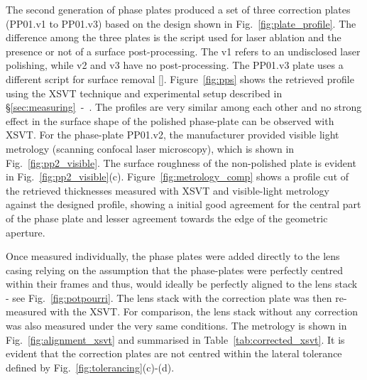 \begin{refsection}
The second generation of phase plates produced a set of three correction plates (PP01.v1 to PP01.v3) based on the design shown in Fig.~\ref{fig:plate_profile}. The difference among the three plates is the script used for laser ablation and the presence or not of a surface post-processing. The v1 refers to an undisclosed laser polishing, while v2 and v3 have no post-processing. The PP01.v3 plate uses a different script for surface removal [\cite{Antipov2020}]. Figure~\ref{fig:pps} shows the retrieved profile using the XSVT technique and experimental setup described in \S\ref{sec:measuring}~-~\textit{}. The profiles are very similar among each other and no strong effect in the surface shape of the polished phase-plate can be observed with XSVT. For the phase-plate PP01.v2, the manufacturer provided visible light metrology (scanning confocal laser microscopy), which is shown in Fig.~\ref{fig:pp2_visible}. The surface roughness of the non-polished plate is evident in Fig.~\ref{fig:pp2_visible}(c). Figure~\ref{fig:metrology_comp} shows a profile cut of the retrieved thicknesses measured with XSVT and visible-light metrology against the designed profile, showing a initial good agreement for the central part of the phase plate and lesser agreement towards the edge of the geometric aperture.  

Once measured individually, the phase plates were added directly to the lens casing relying on the assumption that the phase-plates were perfectly centred within their frames and thus, would ideally be perfectly aligned to the lens stack - see Fig.~\ref{fig:potpourri}. The lens stack with the correction plate was then re-measured with the XSVT. For comparison, the lens stack without any correction was also measured under the very same conditions. The metrology is shown in Fig.~\ref{fig:alignment_xsvt} and summarised in Table~\ref{tab:corrected_xsvt}. It is evident that the correction plates are not centred within the lateral tolerance defined by Fig.~\ref{fig:tolerancing}(c)-(d).


\end{refsection}
